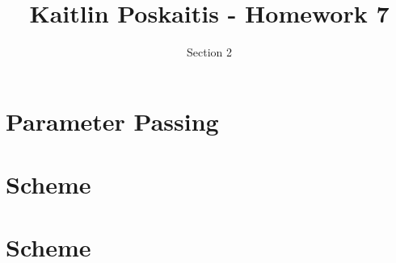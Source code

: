 \documentclass[11pt]{article}
\title{\bf Kaitlin Poskaitis - Homework 7}
\author{Section 2}
\date{}
\begin{document}
\maketitle

\section{Parameter Passing}

\section{Scheme}

\section{Scheme}
\end{document}
